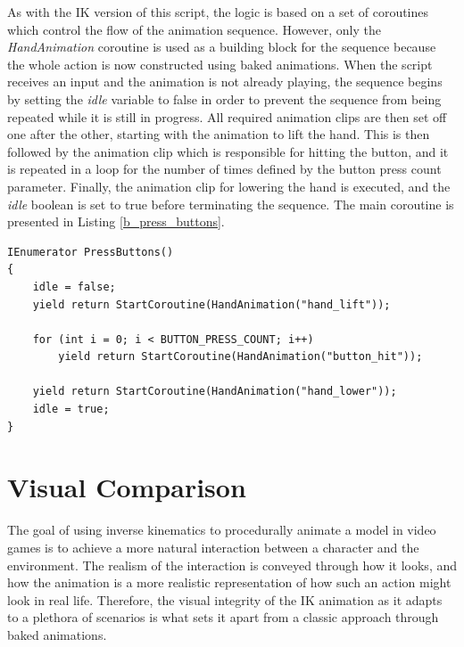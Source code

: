 As with the IK version of this script, the logic is based on a set of coroutines
which control the flow of the animation sequence. However, only the
\textit{HandAnimation} coroutine is used as a building block for the sequence
because the whole action is now constructed using baked animations. When the
script receives an input and the animation is not already playing, the sequence
begins by setting the \textit{idle} variable to false in order to prevent the sequence
from being repeated while it is still in progress. All required animation clips
are then set off one after the other, starting with the animation to lift the
hand. This is then followed by the animation clip which is responsible for
hitting the button, and it is repeated in a loop for the number of times defined
by the button press count parameter. Finally, the animation clip for lowering
the hand is executed, and the \textit{idle} boolean is set to true before
terminating the sequence. The main coroutine is presented in Listing
\ref{b_press_buttons}.

\begin{lstlisting}[basicstyle=\linespread{0.9}\footnotesize\ttfamily, numbers=none,frame=single,
caption={The main coroutine which plays the full animation sequence for the
baked version of the human character. The \textit{HandAnimation} coroutine is
analogous to the one used for the IK character in Listing \ref{first_coroutine}.
\textit{PressButton.cs}},captionpos=t, label=b_press_buttons,
language={[Sharp]c}, float=tp]
IEnumerator PressButtons()
{
    idle = false;
    yield return StartCoroutine(HandAnimation("hand_lift"));
    
    for (int i = 0; i < BUTTON_PRESS_COUNT; i++)
        yield return StartCoroutine(HandAnimation("button_hit"));
    
    yield return StartCoroutine(HandAnimation("hand_lower"));
    idle = true;
}
\end{lstlisting}

\section{Visual Comparison}
The goal of using inverse kinematics to procedurally animate a model in video
games is to achieve a more natural interaction between a character and the
environment. The realism of the interaction is conveyed through how it looks,
and how the animation is a more realistic representation of how such an action
might look in real life. Therefore, the visual integrity of the IK animation as
it adapts to a plethora of scenarios is what sets it apart from a classic
approach through baked animations. 

